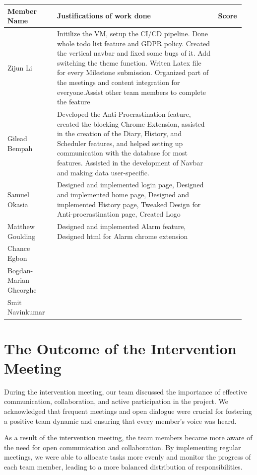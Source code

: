 \documentclass[a4paper]{article}
\begin{document}
{\noindent\begin{tabular}{|p{0.2\linewidth}|p{0.65\linewidth}|p{0.1\linewidth}|} 
	\hline
 \textbf{Member Name} & \textbf{Justifications of work done} & \textbf{Score}\\
 \hline
 Zijun Li & Initilize the VM, setup the CI/CD pipeline. Done whole todo list feature and GDPR policy. Created the vertical navbar and fixed some bugs of it. Add switching the theme function. Writen Latex file for every Milestone submission. Organized part of the meetings and content integration for everyone.Assist other team members to complete the feature & \\
 \hline
 Gilead Bempah & Developed the Anti-Procrastination feature, created the blocking Chrome Extension, assisted in the creation of the Diary, History, and Scheduler features, and helped setting up communication with the database for most features. Assisted in the development of Navbar and making data user-specific.& \\
 \hline
 Samuel Okasia & Designed and implemented login page, Designed and implemented home page, Designed and implemented History page, Tweaked Design for Anti-procrastination page, Created Logo & \\
 \hline
 Matthew Goulding& Designed and implemented Alarm feature, Designed html for Alarm chrome extension & \\
 \hline
 Chance Egbon & &\\
 \hline
 Bogdan-Marian Gheorghe & &\\
 \hline
 Smit Navinkumar& &\\
 \hline
\end{tabular}}

\newpage

\section*{The Outcome of the Intervention Meeting}

During the intervention meeting, our team discussed the importance of effective communication, collaboration, and active participation in the project. We acknowledged that frequent meetings and open dialogue were crucial for fostering a positive team dynamic and ensuring that every member's voice was heard.

As a result of the intervention meeting, the team members became more aware of the need for open communication and collaboration. By implementing regular meetings, we were able to allocate tasks more evenly and monitor the progress of each team member, leading to a more balanced distribution of responsibilities.
\end{document}
